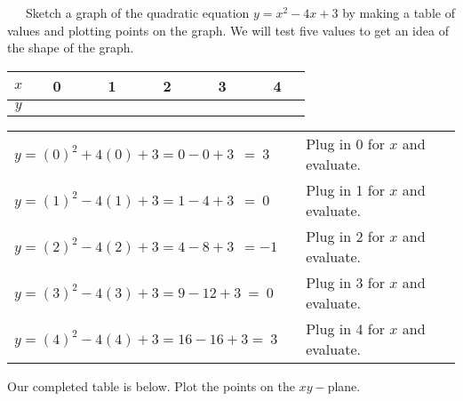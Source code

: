 \begin{example}~~~Sketch a graph of the quadratic equation $y = x^2 - 4 x + 3$ by making a table of values and plotting points on the graph.\pp
We will test five values to get an idea of the shape of the graph.	
	\begin{center}
	\begin{tabular}{|c|c|c|c|c|c|}
	\hline 
	$x$ & ~~0~~ & ~~1~~ & ~~2~~ & ~~3~~ & ~~4~~\\
	\hline 
	$y$ &  &  &  &  & \\
	\hline
	\end{tabular}
	\end{center}
 \begin{center}
	\begin{tabular}{lcl}
	  $y =(0)^2 + 4 (0) + 3=0 - 0 + 3~~=~3$ &&  Plug in 0 for $x$ and evaluate.\\
		$y =(1)^2 - 4 (1) + 3=1 - 4 + 3~~=~0$ &&  Plug in 1 for $x$ and evaluate.\\
    $y =(2)^2 - 4 (2) + 3=4 - 8 + 3~~=- 1$ &&  Plug in 2 for $x$ and evaluate.\\
    $y =(3)^2 - 4 (3) + 3=9 - 12 + 3~=~0$ &&  Plug in 3 for $x$ and evaluate.\\
    $y =(4)^2 - 4 (4) + 3=16 - 16 + 3=~3$ &&  Plug in 4 for $x$ and evaluate.%
	\end{tabular}
\end{center}
\newpage
Our completed table is below.  Plot the points on the $xy-$plane.
	\begin{center}

\end{center}
\end{example}
